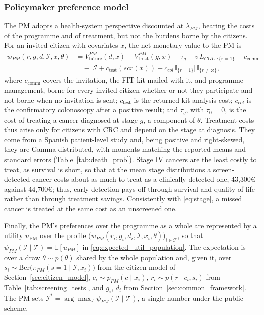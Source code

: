 \documentclass[12pt]{article}
\begin{document}
\subsubsection{Policymaker preference model}\label{sec:pm_model}

The PM adopts a health-system perspective discounted at $\lambda_{PM}$, bearing the costs of the programme and of treatment, but not the burdens borne by the citizens. For an invited citizen with covariates $x$, the net monetary value to the PM is
\begin{align}\label{eq:wpm}
w_{PM}(r,g,d,\mathcal{I},x,\theta) &= V^{PM}_{\text{future}}(d,x) - V^{PM}_{\text{treat}}(g,x) - \tau_g - v\,L_{COL}\,\mathbb{I}_{\{r=1\}}
  - c_{\text{comm}} \nonumber \\ 
  & \quad - \big[\mathcal{I} + c_{\text{test}}(scr(x)) + c_{col}\,\mathbb{I}_{\{r=1\}}\big]\,\mathbb{I}_{\{r\neq\varnothing\}},
\end{align}
where $c_{\text{comm}}$ covers the invitation, the FIT kit mailed with it, and programme management, borne for every invited citizen whether or not they participate and not borne when no invitation is sent; $c_{\text{test}}$ is the returned kit analysis cost; $c_{col}$ is the confirmatory colonoscopy after a positive result; and $\tau_g$, with $\tau_0 = 0$, is the cost of treating a cancer diagnosed at stage $g$, a component of $\theta$. Treatment costs thus arise only for citizens with CRC and depend on the stage at diagnosis. They come from a Spanish patient-level study \citep{corral2015estimation} and, being positive and right-skewed, they are Gamma distributed, with moments matching the reported means and standard errors \citep{briggs2006decision} (Table~\ref{tab:death_prob}). Stage IV cancers are the least costly to treat, as survival is short, so that at the mean stage distributions a screen-detected cancer costs about as much to treat as a clinically detected one, 43{,}300€ against 44{,}700€; thus, early detection pays off through survival and quality of life rather than through treatment savings. Consistently with \eqref{eq:stage}, a missed cancer is treated at the same cost as an unscreened one.

Finally, the PM's preferences over the programme as a whole are represented by a utility $u_{\text{PM}}$ over the profile $\big(w_{PM}(r_i,g_i,d_i,\mathcal{I},x_i,\theta)\big)_{i \in \mathcal{T}}$, so that $\psi_{PM}(\mathcal{I} \mid \mathcal{T}) = \mathbb{E}[u_{PM}]$ in \eqref{eq:expected_util_population}. The expectation is over a draw $\theta \sim p(\theta)$ shared by the whole population and, given it, over $s_i \sim \mathrm{Ber}\big(\pi_{PM}(s = 1 \mid \mathcal{I}, x_i)\big)$ from the citizen model of Section~\ref{sec:citizen_model}, $c_i \sim p_{PM}(c \mid x_i)$, $r_i \sim p(r \mid c_i, s_i)$ from Table~\ref{tab:screening_tests}, and $g_i$, $d_i$ from Section~\ref{sec:common_framework}. The PM sets $\mathcal{I}^{*} = \arg\max_{\mathcal{I}} \psi_{PM}(\mathcal{I} \mid \mathcal{T})$, a single number under the public scheme.
\end{document}
